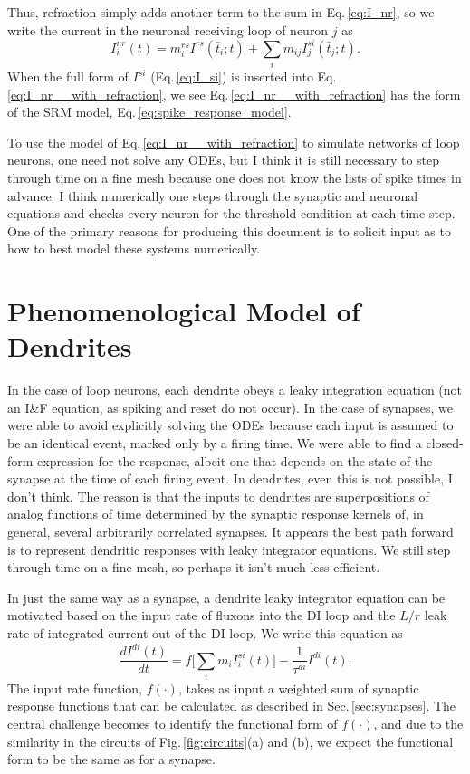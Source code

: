 \documentclass[]{article}
\begin{document}
Thus, refraction simply adds another term to the sum in Eq.\,\ref{eq:I_nr}, so we write the current in the neuronal receiving loop of neuron $j$ as
\begin{equation}
\label{eq:I_nr__with_refraction}
I_i^{nr}(t) = m_i^{rs}I^{rs}(\bar{t}_i;t)+\sum_i m_{ij} I_j^{si}(\bar{t}_j;t).
\end{equation}
When the full form of $I^{si}$ (Eq.\,\ref{eq:I_si}) is inserted into Eq.\,\ref{eq:I_nr__with_refraction}, we see Eq.\,\ref{eq:I_nr__with_refraction} has the form of the SRM model, Eq.\,\ref{eq:spike_response_model}.

To use the model of Eq.\,\ref{eq:I_nr__with_refraction} to simulate networks of loop neurons, one need not solve any ODEs, but I think it is still necessary to step through time on a fine mesh because one does not know the lists of spike times in advance. I think numerically one steps through the synaptic and neuronal equations and checks every neuron for the threshold condition at each time step. One of the primary reasons for producing this document is to solicit input as to how to best model these systems numerically.

\section{\label{sec:dendrites}Phenomenological Model of Dendrites}
In the case of loop neurons, each dendrite obeys a leaky integration equation (not an I\&F equation, as spiking and reset do not occur). In the case of synapses, we were able to avoid explicitly solving the ODEs because each input is assumed to be an identical event, marked only by a firing time. We were able to find a closed-form expression for the response, albeit one that depends on the state of the synapse at the time of each firing event. In dendrites, even this is not possible, I don't think. The reason is that the inputs to dendrites are superpositions of analog functions of time determined by the synaptic response kernels of, in general, several arbitrarily correlated synapses. It appears the best path forward is to represent dendritic responses with leaky integrator equations. We still step through time on a fine mesh, so perhaps it isn't much less efficient.

In just the same way as a synapse, a dendrite leaky integrator equation can be motivated based on the input rate of fluxons into the DI loop and the $L/r$ leak rate of integrated current out of the DI loop. We write this equation as 
\begin{equation}
\label{eq:I_dr}
\frac{dI^{di}(t)}{dt} = f\bigg[\sum_i m_i I_i^{si}(t)\bigg]-\frac{1}{\tau^{di}}I^{di}(t).
\end{equation}
The input rate function, $f(\cdot)$, takes as input a weighted sum of synaptic response functions that can be calculated as described in Sec.\,\ref{sec:synapses}. The central challenge becomes to identify the functional form of $f(\cdot)$, and due to the similarity in the circuits of Fig.\,\ref{fig:circuits}(a) and (b), we expect the functional form to be the same as for a synapse.
\end{document}
